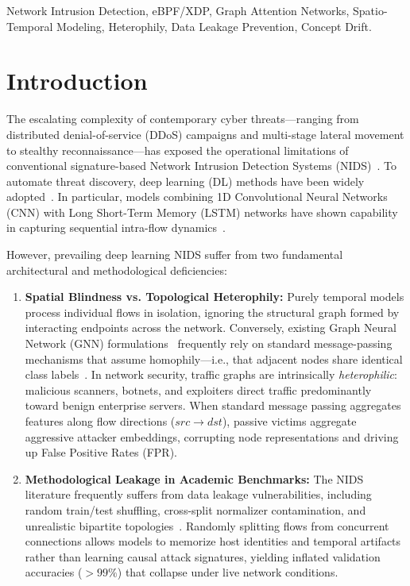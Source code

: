 \documentclass[conference]{IEEEtran}
\begin{document}
\begin{IEEEkeywords}
Network Intrusion Detection, eBPF/XDP, Graph Attention Networks, Spatio-Temporal Modeling, Heterophily, Data Leakage Prevention, Concept Drift.
\end{IEEEkeywords}

\section{Introduction}

The escalating complexity of contemporary cyber threats---ranging from distributed denial-of-service (DDoS) campaigns and multi-stage lateral movement to stealthy reconnaissance---has exposed the operational limitations of conventional signature-based Network Intrusion Detection Systems (NIDS)~\cite{scarfone2007guide}. To automate threat discovery, deep learning (DL) methods have been widely adopted~\cite{vinayakumar2019deep}. In particular, models combining 1D Convolutional Neural Networks (CNN) with Long Short-Term Memory (LSTM) networks have shown capability in capturing sequential intra-flow dynamics~\cite{hochreiter1997long}.

However, prevailing deep learning NIDS suffer from two fundamental architectural and methodological deficiencies:
\begin{enumerate}
    \item \textbf{Spatial Blindness vs. Topological Heterophily:} Purely temporal models process individual flows in isolation, ignoring the structural graph formed by interacting endpoints across the network. Conversely, existing Graph Neural Network (GNN) formulations~\cite{kipf2017semi,velickovic2018graph} frequently rely on standard message-passing mechanisms that assume homophily---i.e., that adjacent nodes share identical class labels~\cite{zhu2020beyond}. In network security, traffic graphs are intrinsically \textit{heterophilic}: malicious scanners, botnets, and exploiters direct traffic predominantly toward benign enterprise servers. When standard message passing aggregates features along flow directions ($src \to dst$), passive victims aggregate aggressive attacker embeddings, corrupting node representations and driving up False Positive Rates (FPR).
    \item \textbf{Methodological Leakage in Academic Benchmarks:} The NIDS literature frequently suffers from data leakage vulnerabilities, including random train/test shuffling, cross-split normalizer contamination, and unrealistic bipartite topologies~\cite{arp2022dos,pendlebury2019tesseract}. Randomly splitting flows from concurrent connections allows models to memorize host identities and temporal artifacts rather than learning causal attack signatures, yielding inflated validation accuracies ($>99\%$) that collapse under live network conditions.
\end{enumerate}
\end{document}
